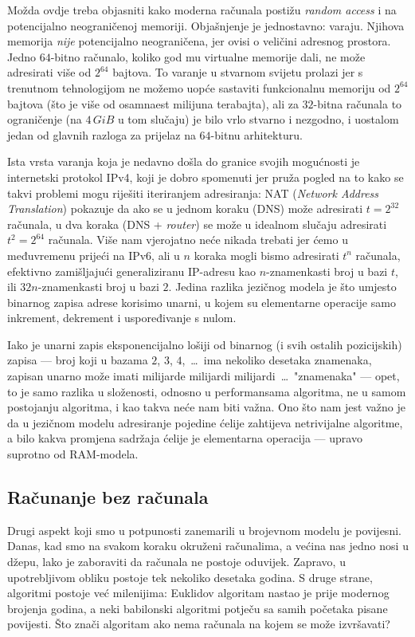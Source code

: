 Možda ovdje treba objasniti kako moderna računala postižu \emph{random access} i na potencijalno neograničenoj memoriji. Objašnjenje je jednostavno: varaju. Njihova memorija \emph{nije} potencijalno neograničena, jer ovisi o veličini adresnog prostora. Jedno $64$-bitno računalo, koliko god mu virtualne memorije dali, ne može adresirati više od $2^{64}$ bajtova. To varanje u stvarnom svijetu prolazi jer s trenutnom tehnologijom ne možemo uopće sastaviti funkcionalnu memoriju od $2^{64}$ bajtova (što je više od osamnaest milijuna terabajta), ali za $32$-bitna računala to ograničenje (na $4\,GiB$ u tom slučaju) je bilo vrlo stvarno i nezgodno, i uostalom jedan od glavnih razloga za prijelaz na $64$-bitnu arhitekturu.

Ista vrsta varanja koja je nedavno došla do granice svojih mogućnosti je internetski protokol IPv4, koji je dobro spomenuti jer pruža pogled na to kako se takvi problemi mogu riješiti iteriranjem adresiranja: NAT (\emph{Network Address Translation}) pokazuje da ako se u jednom koraku (DNS) može adresirati $t=2^{32}$ računala, u dva koraka (DNS + \emph{router}) se može u idealnom slučaju adresirati $t^2=2^{64}$ računala. Više nam vjerojatno neće nikada trebati jer ćemo u međuvremenu prijeći na IPv6, ali u $n$ koraka mogli bismo adresirati $t^n$ računala, efektivno zamišljajući generaliziranu IP-adresu kao $n$-znamenkasti broj u bazi $t$, ili $32n$-znamenkasti broj u bazi $2$. Jedina razlika jezičnog modela je što umjesto binarnog zapisa adrese korisimo unarni, u kojem su elementarne operacije samo inkrement, dekrement i  uspoređivanje s nulom.

Iako je unarni zapis eksponencijalno lošiji od binarnog (i svih ostalih pozicijskih) zapisa --- broj koji u bazama $2$, $3$, $4$,~\ldots\ ima nekoliko desetaka znamenaka, zapisan unarno može imati milijarde milijardi milijardi~\ldots\ "znamenaka" --- opet, to je samo razlika u složenosti, odnosno u performansama algoritma, ne u samom postojanju algoritma, i kao takva neće nam biti važna. Ono što nam jest važno je da u jezičnom modelu adresiranje pojedine ćelije zahtijeva netrivijalne algoritme, a bilo kakva promjena sadržaja ćelije je elementarna operacija --- upravo suprotno od RAM-modela.

\subsection{Računanje bez računala}

Drugi aspekt koji smo u potpunosti zanemarili u brojevnom modelu je povijesni. Danas, kad smo na svakom koraku okruženi računalima, a većina nas jedno nosi u džepu, lako je zaboraviti da računala ne postoje oduvijek. Zapravo, u upotrebljivom obliku postoje tek nekoliko desetaka godina. S druge strane, algoritmi postoje već milenijima: Euklidov algoritam nastao je prije modernog brojenja godina, a neki babilonski algoritmi potječu sa samih početaka pisane povijesti. Što znači algoritam ako nema računala na kojem se može izvršavati?

